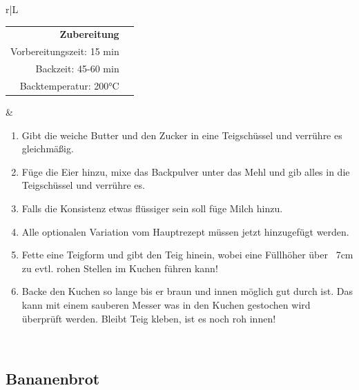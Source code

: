 \documentclass[a4paper, 12pt]{scrbook} 								%
\numberwithin{equation}{section} 									%
\begin{document}
		\begin{tabularx}{\textwidth}{r|L}
									

			\begin{tabular}[t]{rr}
				\textbf{Zubereitung}	\\
				Vorbereitungszeit: 15 min	\\
				Backzeit:	45-60 min		\\
				Backtemperatur: 200°C \\
			\end{tabular}			&	\begin{enumerate}[nosep]
											\item Gibt die weiche Butter und den Zucker in eine Teigschüssel und verrühre es gleichmäßig.
											\item Füge die Eier hinzu, mixe das Backpulver unter das Mehl und gib alles in die Teigschüssel und verrühre es.
											\item Falls die Konsistenz etwas flüssiger sein soll füge Milch hinzu.
											\item Alle optionalen Variation vom Hauptrezept müssen jetzt hinzugefügt werden.
											\item Fette eine Teigform und gibt den Teig hinein, wobei eine Füllhöher über ~7cm zu evtl. rohen Stellen im Kuchen führen kann!
											\item Backe den Kuchen so lange bis er braun und innen möglich gut durch ist. Das kann mit einem sauberen Messer was in den Kuchen gestochen wird überprüft werden. Bleibt Teig kleben, ist es noch roh innen!
										\end{enumerate}	\\
		\end{tabularx}
		\newpage



		\subsection{Bananenbrot}	\label{bananenbrot}
\end{document}
